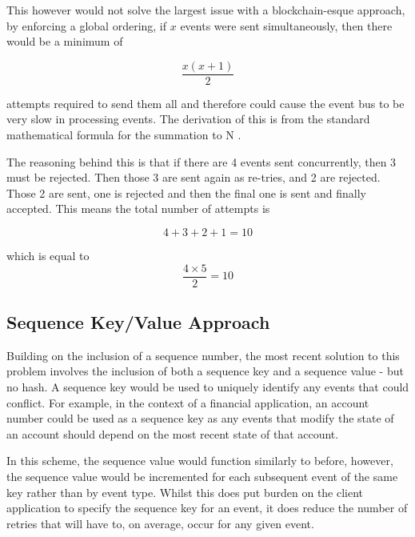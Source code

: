 \documentclass{l3proj}
\begin{document}


This however would not solve the largest issue with a blockchain-esque approach, by enforcing a global ordering, if \(x\) events were sent simultaneously, then there would be a minimum of

\begin{equation}
    \frac{ x (x + 1) }{ 2 }
\end{equation}

attempts required to send them all and therefore could cause the event bus to be very slow in processing events. The derivation of this is from the standard mathematical formula for the summation to N \cite{sumton}.

The reasoning behind this is that if there are 4 events sent concurrently, then 3 must be rejected. Then those 3 are sent again as re-tries, and 2 are rejected. Those 2 are sent, one is rejected and then the final one is sent and finally accepted. This means the total number of attempts is

\begin{equation}
    4 + 3 + 2 + 1 = 10
\end{equation}

which is equal to
\begin{equation}
    \frac{ 4 \times 5 }{ 2 } = 10
\end{equation}

\subsection{Sequence Key/Value Approach}
Building on the inclusion of a sequence number, the most recent solution to this problem involves the inclusion of both a sequence key and a sequence value - but no hash. A sequence key would be used to uniquely identify any events that could conflict. For example, in the context of a financial application, an account number could be used as a sequence key as any events that modify the state of an account should depend on the most recent state of that account.



In this scheme, the sequence value would function similarly to before, however, the sequence value would be incremented for each subsequent event of the same key rather than by event type. Whilst this does put burden on the client application to specify the sequence key for an event, it does reduce the number of retries that will have to, on average, occur for any given event.
\end{document}
